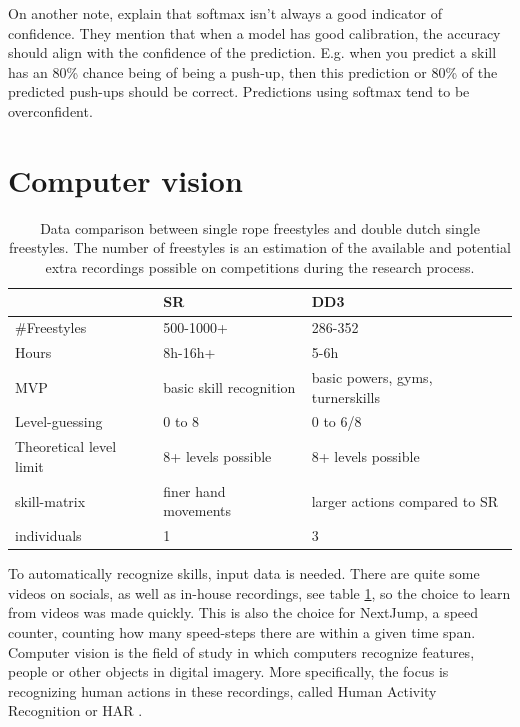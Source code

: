On another note, \textcite{Guo_2017} explain that softmax isn't always a good indicator of confidence. They mention that when a model has good calibration, the accuracy should align with the confidence of the prediction. E.g. when you predict a skill has an 80\% chance being of being a push-up, then this prediction or 80\% of the predicted push-ups should be correct. Predictions using softmax tend to be overconfident.



\section{Computer vision}
\label{lit:computer-vision}

\begin{table}[t]
    \centering
    \begin{tabular}{|l|l|l|}
        \hline
        & SR & DD3 \\ \hline
        \#Freestyles & 500-1000+ & 286-352 \\ \hline
        Hours & 8h-16h+ & 5-6h \\ \hline
        MVP & basic skill recognition & basic powers, gyms, turnerskills \\ \hline
        Level-guessing & 0 to 8 & 0 to 6/8 \\ \hline
        Theoretical level limit & 8+ levels possible & 8+ levels possible \\ \hline
        skill-matrix & finer hand movements & larger actions compared to SR \\ \hline
        individuals & 1 & 3 \\ \hline
    \end{tabular}
    \caption[Collected videos data comparison]{Data comparison between single rope freestyles and double dutch single freestyles. The number of freestyles is an estimation of the available and potential extra recordings possible on competitions during the research process.}
    \label{tbl:data-comparison-sr-dd}
\end{table}

To automatically recognize skills, input data is needed. There are quite some videos on socials, as well as in-house recordings, see table \ref{tbl:data-comparison-sr-dd}, so the choice to learn from videos was made quickly. This is also the choice for NextJump, a speed counter, counting how many speed-steps there are within a given time span.
Computer vision is the field of study in which computers recognize features, people or other objects in digital imagery. More specifically, the focus is recognizing human actions in these recordings, called Human Activity Recognition or HAR \autocite{Pareek_2020}.


